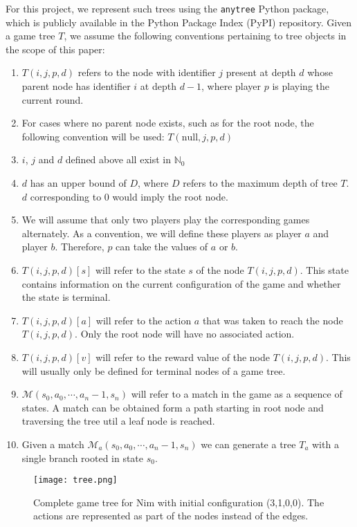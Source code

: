 For this project, we represent such trees using the \texttt{anytree} Python package, which is publicly available in the Python Package Index (PyPI) repository. Given a game tree $T$, we assume the following conventions pertaining to tree objects in the scope of this paper:

\begin{enumerate}
    \item $T(i,j,p,d)$ refers to the node with identifier $j$ present at depth $d$ whose parent node has identifier $i$ at depth $d-1$, where player $p$ is playing the current round.
    \item For cases where no parent node exists, such as for the root node, the following convention will be used: $T(\text{null},j,p,d)$
    \item $i$, $j$ and $d$ defined above all exist in $\mathbb{N}_0$
    \item $d$ has an upper bound of $D$, where $D$ refers to the maximum depth of tree $T$. $d$ corresponding to $0$ would imply the root node.
    \item We will assume that only two players play the corresponding games alternately. As a convention, we will define these players as player $a$ and player $b$. Therefore, $p$ can take the values of $a$ or $b$.
    \item $T(i,j,p,d)[s]$ will refer to the state $s$ of the node $T(i,j,p,d)$. This state contains information on the current configuration of the game and whether the state is terminal. 
    \item $T(i,j,p,d)[a]$ will refer to the action $a$ that was taken to reach the node $T(i,j,p,d)$. Only the root node will have no associated action.
    \item $T(i,j,p,d)[v]$ will refer to the reward value of the node $T(i,j,p,d)$. This will usually only be defined for terminal nodes of a game tree.
    \item $\mathcal{M}(s_0,a_0,\cdots,a_n-1,s_n)$ will refer to a match in the game as a sequence of states. A match can be obtained form a path starting in root node and traversing the tree util a leaf node is reached.
    \item Given a match $\mathcal{M}_a(s_0,a_0,\cdots,a_n-1,s_n)$ we can generate a tree $T_a$ with a single branch rooted in state $s_0$.
\end{enumerate}

\begin{figure}[H]
    \centering
    \texttt{[image: tree.png]}
    \caption{Complete game tree for Nim with initial configuration (3,1,0,0). The actions are represented as part of the nodes instead of the edges.}
\end{figure}
